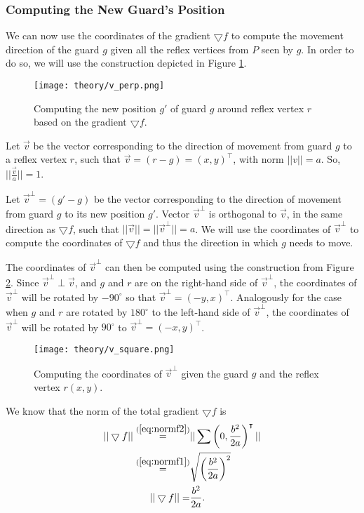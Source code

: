 \subsubsection{Computing the New Guard's Position}
We can now use the coordinates of the gradient $\bigtriangledown f$ to compute the movement direction of the guard $g$ given all the reflex vertices from $P$ seen by $g$. In order to do so, we will use the construction depicted in Figure \ref{fig:vperp}. 

\begin{figure}[h!]
    \centering
    \texttt{[image: theory/v\_perp.png]}
    \caption{Computing the new position $g'$ of guard $g$ around reflex vertex $r$ based on the gradient $\bigtriangledown f$.}
    \label{fig:vperp}
\end{figure}

Let $\vec v$ be the vector corresponding to the direction of movement from guard $g$ to a reflex vertex $r$, such that $\vec{v} = (r - g) = (x, y)^\intercal$, with norm $||v|| = a$. So, $||\frac{\vec v}{a}|| = 1$.

Let $\vec{v}^\perp  = (g' - g)$ be the vector corresponding to the direction of movement from guard $g$ to its new position $g'$. Vector $\vec v^\perp$ is orthogonal to $\vec{v}$, in the same direction as $\bigtriangledown f$, such that $||\vec{v}|| = ||\vec{v}^\perp|| = a$. We will use the coordinates of $\vec{v}^\perp$ to compute the coordinates of $\bigtriangledown f$ and thus the direction in which $g$ needs to move.

The coordinates of $\vec v^\perp$ can then be computed using the construction from Figure \ref{fig:vsquare}. Since $\vec v^\perp \perp \vec v$, and $g$ and $r$ are on the right-hand side of $\vec v^\perp$, the coordinates of $\vec v^\perp$ will be rotated by $-90^\circ$ so that $\vec v^\perp = (-y, x)^\intercal$. Analogously for the case when $g$ and $r$ are rotated by $180^\circ$ to the left-hand side of $\vec v^\perp$, the coordinates of $\vec v^\perp$ will be rotated by $90^\circ$ to $\vec v^\perp = (-x, y)^\intercal$.

\begin{figure}[h!]
    \centering
    \texttt{[image: theory/v\_square.png]}
    \caption{Computing the coordinates of $\vec v^\perp$ given the guard $g$ and the reflex vertex $r(x, y)$.}
    \label{fig:vsquare}
\end{figure}

We know that the norm of the total gradient $\bigtriangledown f$ is 
\begin{align}
    ||\bigtriangledown f|| \overset{(\ref{eq:normf2})}{=} &||\sum \left(0, \frac{b^2}{2a}\right)^\intercal|| \\
    \overset{(\ref{eq:normf1})}{=} &\sqrt{\left(\frac{b^2}{2a}\right)^2} \\
    ||\bigtriangledown f|| = &\frac{b^2}{2a}. \label{eq:normf}
\end{align}

